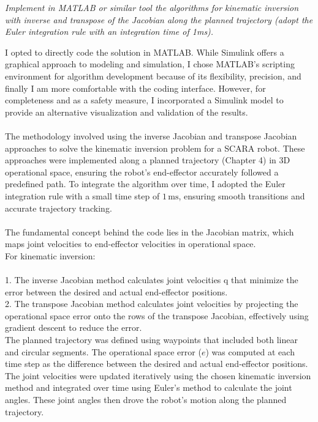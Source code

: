 \documentclass[12pt]{report}
\begin{document}
		
		\begin{center}
			\textit{Implement in MATLAB or similar tool the algorithms for kinematic inversion with inverse and transpose of the Jacobian along the planned trajectory (adopt the Euler integration rule with an integration time of 1ms).}
		\end{center}
		I opted to directly code the solution in MATLAB. While Simulink offers a graphical approach to modeling and simulation, I chose MATLAB’s scripting environment for algorithm development because of its flexibility, precision, and finally I am more comfortable with the coding interface. However, for completeness and as a safety measure, I incorporated a Simulink model to provide an alternative visualization and validation of the results.
		\\\\The methodology involved using the inverse Jacobian and transpose Jacobian approaches to solve the kinematic inversion problem for a SCARA robot. These approaches were implemented along a planned trajectory (Chapter 4) in 3D operational space, ensuring the robot's end-effector accurately followed a predefined path. To integrate the algorithm over time, I adopted the Euler integration rule with a small time step of \(1 \, \text{ms}\), ensuring smooth transitions and accurate trajectory tracking.\\\\
		The fundamental concept behind the code lies in the Jacobian matrix, which maps joint velocities to end-effector velocities in operational space. \\For kinematic inversion:\\\\
		1. The inverse Jacobian method calculates joint velocities q that minimize the error between the desired and actual end-effector positions.\\
		2. The transpose Jacobian method calculates joint velocities by projecting the operational space error onto the rows of the transpose Jacobian, effectively using gradient descent to reduce the error.\\
		
		The planned trajectory was defined using waypoints that included both linear and circular segments. The operational space error (\(e\)) was computed at each time step as the difference between the desired and actual end-effector positions. The joint velocities were updated iteratively using the chosen kinematic inversion method and integrated over time using Euler's method to calculate the joint angles. These joint angles then drove the robot's motion along the planned trajectory.
		
\end{document}
